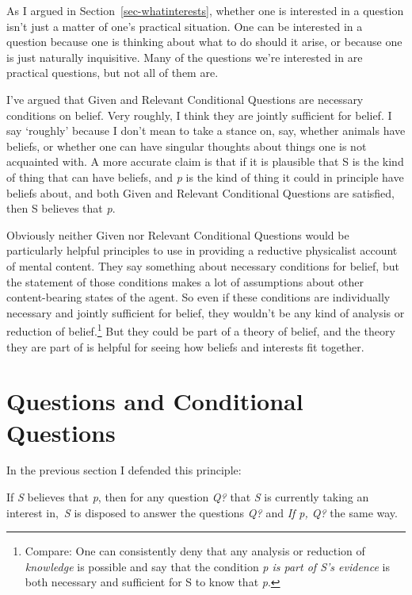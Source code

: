 \documentclass[
  10pt,
  letterpaper,
  twoside]{scrbook}
\providecommand{\tightlist}{%
  \setlength{\itemsep}{0pt}\setlength{\parskip}{0pt}}\usepackage{longtable,booktabs,array}
\begin{document}
As I argued in Section~\ref{sec-whatinterests}, whether one is
interested in a question isn't just a matter of one's practical
situation. One can be interested in a question because one is thinking
about what to do should it arise, or because one is just naturally
inquisitive. Many of the questions we're interested in are practical
questions, but not all of them are.

I've argued that Given and Relevant Conditional Questions are necessary
conditions on belief. Very roughly, I think they are jointly sufficient
for belief. I say `roughly' because I don't mean to take a stance on,
say, whether animals have beliefs, or whether one can have singular
thoughts about things one is not acquainted with. A more accurate claim
is that if it is plausible that S is the kind of thing that can have
beliefs, and \emph{p} is the kind of thing it could in principle have
beliefs about, and both Given and Relevant Conditional Questions are
satisfied, then S believes that \emph{p}.

Obviously neither Given nor Relevant Conditional Questions would be
particularly helpful principles to use in providing a reductive
physicalist account of mental content. They say something about
necessary conditions for belief, but the statement of those conditions
makes a lot of assumptions about other content-bearing states of the
agent. So even if these conditions are individually necessary and
jointly sufficient for belief, they wouldn't be any kind of analysis or
reduction of belief.\footnote{Compare: One can consistently deny that
  any analysis or reduction of \emph{knowledge} is possible and say that
  the condition \emph{p is part of S's evidence} is both necessary and
  sufficient for S to know that \emph{p}.} But they could be part of a
theory of belief, and the theory they are part of is helpful for seeing
how beliefs and interests fit together.

\section{Questions and Conditional Questions}\label{sec-questions}

In the previous section I defended this principle:

\begin{description}
\tightlist
\item[Relevant Conditional Questions]
If \emph{S} believes that \emph{p}, then for any question \emph{Q?} that
\emph{S} is currently taking an interest in,~\emph{S} is disposed to
answer the questions \emph{Q?} and \emph{If p, Q?} the same way.
\end{description}
\end{document}
